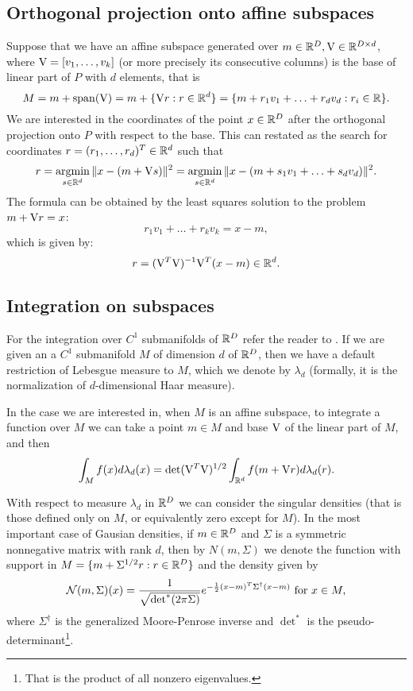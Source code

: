 \subsection{Orthogonal projection onto affine subspaces}

Suppose that we have an affine subspace generated over $m \in \mathbb{R}^D,\mathrm{V} \in \mathbb{R}^{D \times d}$, where 
$\mathrm{V}=[v_1,\ldots,v_k]$ (or more precisely its consecutive columns) is the base of linear part of $P$ with $d$ elements, that is
$$
M=m+\mathrm{span} (\mathrm{V})=m+\{\mathrm{V} r:r \in \mathbb{R}^d\}=\{m+r_1v_1+\ldots+r_dv_d: r_i \in \mathbb{R}\}.
$$
We are interested in the coordinates of the point $x \in \mathbb{R}^D$ after the orthogonal
projection onto $P$ with respect to the base.
This can restated as the search for coordinates $r=(r_1,\ldots,r_d)^T \in \mathbb{R}^d$
such that
$$
r=\operatorname*{argmin}_{s \in \mathbb{R}^d} \|x-(m+\mathrm{V} s)\|^2=\operatorname*{argmin}_{s \in \mathbb{R}^d} \|x-(m+s_1v_1+\ldots+s_dv_d)\|^2.
$$
The formula can be obtained by the least squares solution to the problem $m+\mathrm{V} r=x$:
$$
r_1v_1+\ldots+r_kv_k=x-m,
$$
which is given by:
$$
r=(\mathrm{V}^T\mathrm{V})^{-1}\mathrm{V}^T(x-m) \in \mathbb{R}^d.
$$


\subsection{Integration on subspaces}

For the integration over $C^1$ submanifolds of $\mathbb{R}^D$ refer the reader to  \cite{munkres1997analysis, federer2014geometric}. If we are given an a $C^1$ submanifold $M$  of dimension $d$ of $\mathbb{R}^D$, then we have a default restriction of Lebesgue measure to $M$, which we denote by $\lambda_d$ (formally, it is the normalization of $d$-dimensional Haar measure).

In the case we are interested in, when $M$ is an affine subspace, to integrate
a function over $M$ we can take a point $m \in M$ and base $\mathrm{V}$ of the linear part
of $M$, and then
$$
\int_M f(x) d\lambda_d(x)=\det(\mathrm{V}^T\mathrm{V})^{1/2} \int_{\mathbb{R}^d} f(m+\mathrm{V} r) d\lambda_d(r).
$$

With respect to measure $\lambda_d$ in $\mathbb{R}^D$ we can consider the 
singular densities (that is those defined only on $M$, or equivalently zero 
except for $M$). In the most important case of Gausian densities, if $m \in \mathbb{R}^D$ and $\Sigma$ is a symmetric nonnegative 
matrix with rank $d$, then by $N(m,\Sigma)$ we denote the function with support
in $M=\{m+\Sigma^{1/2}r : r\in \mathbb{R}^D\}$ and the density given by
$$
\mathcal{N}(m,\Sigma)(x)=\frac{1}{\sqrt{\det^{*}(2\pi \Sigma )}} e^{-\frac{1}{2}(x -m)^T{\Sigma }^\dagger (x -m)} \text{ for } x \in M,
$$
where $\Sigma^\dagger$ is the generalized Moore-Penrose inverse and $\det^*$ is the pseudo-determinant\footnote{That is the product of all nonzero eigenvalues.}.

